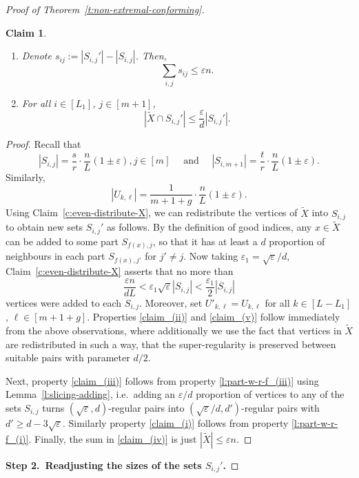 \documentclass[reqno, 12pt]{amsart}
\numberwithin{equation}{section}
\numberwithin{figure}{section}
\theoremstyle{plain}
\newtheorem{claim}[thm]{Claim}
\theoremstyle{definition}
\let\eps=\varepsilon
\begin{document}
\begin{proof}[Proof of Theorem~\ref{t:non-extremal-conforming}]
\begin{claim}
\begin{enumerate}[label=(\roman*')]
            \item\label{claim_(iv)} Denote $s_{ij}:=|S_{i,j}'|-|S_{i,j}|$. Then, $$\sum_{i,j}s_{ij}\leq \eps n.$$ 
            
            \item\label{claim_(v)} For all $i\in[L_1]$, $j\in [m+1]$, 
            $$|\tilde X\cap S_{i,j}'|\leq \frac{\eps}{d}|S_{i,j}'|.$$
        \end{enumerate}
    \end{claim}
             
    \begin{proof}
        Recall that 
        \[ |S_{i,j}|=\frac{s}{r}\cdot\frac{n}{L}(1\pm\eps), j\in[m] \quad \text{ and } \quad |S_{i,m+1}|=\frac{t}{r}\cdot\frac{n}{L}(1\pm\eps). \]
        Similarly,
        \[ |U_{k,\ell}|=\frac1{m+1+g}\cdot\frac{n}{L}(1\pm\eps).\]
        Using Claim~\ref{c:even-distribute-X}, we can redistribute the vertices of $\tilde X$ into $S_{i,j}$ to obtain new sets $S_{i,j}'$ as follows. By the definition of good indices, any $x\in \tilde X$ can be added to some part $S_{f(x),j}$, so that it has at least a $d$ proportion of neighbours in each part $S_{f(x),j'}$ for $j' \neq j$. Now taking $\eps_1 = \sqrt{\eps}/d$, Claim~\ref{c:even-distribute-X} asserts that no more than 
        \[\frac{\eps n}{dL} < \eps_1\sqrt{\eps}|S_{i,j}|< \frac{\eps_1}2|S_{i,j}|\] vertices were added to each $S_{i,j}$. Moreover, set $U'_{k,\ell}=U_{k,\ell}$ for all $k\in[L-L_1]$, $\ell\in[m+1+g]$.
        Properties \ref{claim_(ii)} and \ref{claim_(v)} follow immediately from the above observations, where additionally we use the fact that vertices in $\tilde X$ are redistributed in such a way, that the super-regularity is preserved between suitable pairs with parameter $d/2$. 
        
        Next, property \ref{claim_(iii)} follows from property \ref{l:part-w-r-f_(iii)} using Lemma~\ref{l:slicing-adding}, i.e.~adding an $\eps/d$ proportion of vertices to any of the sets $S_{i,j}$ turns $(\sqrt{\eps},d)$-regular pairs into $(\sqrt\eps/d, d')$-regular pairs with $d'\geq d-3\sqrt \eps$. Similarly property \ref{claim_(i)} follows from property \ref{l:part-w-r-f_(i)}. Finally, the sum in \ref{claim_(iv)} is just $|\tilde X|\leq \eps n $.
    \end{proof} 

    \smallskip

    \textbf{Step 2.~Readjusting the sizes of the sets $S_{i,j}'$.}  
    
    \smallskip
    

\end{proof}
\end{document}
